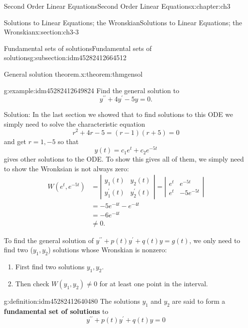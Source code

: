 \documentclass[oneside,10pt,]{book}
\newcommand{\terminology}[1]{\textbf{#1}}
\numberwithin{equation}{section}
\numberwithin{equation}{section}
\newcommand{\amp}{&}
\begin{document}
\begin{chapterptx}{Second Order Linear Equations}{}{Second Order Linear Equations}{}{}{x:chapter:ch3}
\begin{sectionptx}{Solutions to Linear Equations; the Wronskian}{}{Solutions to Linear Equations; the Wronskian}{}{}{x:section:ch3-3}
\begin{subsectionptx}{Fundamental sets of solutions}{}{Fundamental sets of solutions}{}{}{g:subsection:idm45282412664512}
\begin{theorem}{General solution theorem.}{}{x:theorem:thmgensol}
\end{theorem}
\begin{example}{}{g:example:idm45282412649824}%
Find the general solution to%
\begin{equation*}
y^{\prime\prime}+4y^{\prime}-5y=0.
\end{equation*}
%
\par
Solution: In the last section we showed that to find solutions to this ODE we simply need to solve the characteristic equation%
\begin{equation*}
r^{2}+4r-5=\left(r-1\right)\left(r+5\right)=0
\end{equation*}
and get \(r=1,-5\) so that%
\begin{equation*}
y(t)=c_{1}e^{t}+c_{2}e^{-5t}
\end{equation*}
gives other solutions to the ODE. To show this gives all of them, we simply need to show the Wronksian is not always zero:%
\begin{align*}
W\left(e^{t},e^{-5t}\right) \amp =\left|\begin{array}{cc}
y_{1}(t) \amp y_{2}(t)\\
y_{1}^{\prime}(t) \amp y_{2}^{\prime}(t)
\end{array}\right|=\left|\begin{array}{cc}
e^{t} \amp e^{-5t}\\
e^{t} \amp -5e^{-5t}
\end{array}\right|\\
\amp =-5e^{-4t}-e^{-4t}\\
\amp =-6e^{-4t}\\
\amp \neq0.
\end{align*}
%
\end{example}
To find the general solution of \(y^{\prime\prime}+p(t)y^{\prime}+q(t)y=g(t)\), we only need to find two (\(y_{1},y_{2}\)) solutions whose Wronskian is nonzero:%
\begin{enumerate}
\item{}First find two solutions \(y_{1},y_{2}\).%
\item{}Then check \(W(y_{1},y_{2})\neq0\) for at least one point in the interval.%
\end{enumerate}
%
\begin{definition}{}{g:definition:idm45282412640480}%
The solutions \(y_{1}\) and \(y_{2}\) are said to form a \terminology{fundamental set of solutions} to%
\begin{equation*}
y^{\prime\prime}+p(t)y^{\prime}+q(t)y=0
\end{equation*}

\end{definition}
\end{subsectionptx}
\end{sectionptx}
\end{chapterptx}
\end{document}
